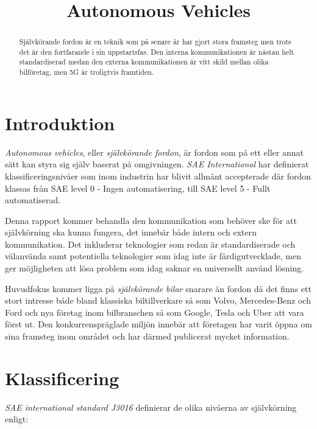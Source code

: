 \documentclass[a4paper]{IEEEtran}
\title{Autonomous Vehicles}
\author{\IEEEauthorblockN{Niklas Hedström, Emil Wihlander\\ }
\IEEEauthorblockA{Lunds Tekniska Högskola\\
Lund, Sverige\\
Email: \{dat15ewi, dat15nhe\}@student.lu.se}}
\begin{document}
\maketitle

\begin{abstract}
Självkörande fordon är en teknik som på senare år har gjort stora framsteg men trots det är den fortfarande i sin uppstartsfas. 
Den interna kommunikationen är nästan helt standardiserad medan den externa kommunikationen är vitt skild mellan olika bilföretag, men 5G är troligtvis framtiden.
\end{abstract}


\section{Introduktion}
\emph{Autonomous vehicles}, eller \emph{självkörande fordon}, är fordon som på ett eller annat sätt kan styra sig själv baserat på omgivningen. 
\emph{SAE International} har definierat klassificeringsnivåer som inom industrin har blivit allmänt accepterade där fordon klassas från SAE level 0 - Ingen automatisering, till SAE level 5 - Fullt automatiserad. \cite{SAE2014} 

Denna rapport kommer behandla den kommunikation som behöver ske för att självkörning ska kunna fungera, det innebär både intern och extern kommunikation. 
Det inkluderar teknologier som redan är standardiserade och välanvända samt potentiella teknologier som idag inte är färdigutvecklade, men ger möjligheten att lösa problem som idag saknar en universellt använd lösning.

Huvudfokus kommer ligga på \emph{självkörande bilar} snarare än fordon då det finns ett stort intresse både bland klassiska biltillverkare så som Volvo, Mercedes-Benz och Ford och nya företag inom bilbranschen så som Google, Tesla och Uber att vara först ut. 
Den konkurrenspräglade miljön innebär att företagen har varit öppna om sina framsteg inom området och har därmed publicerat mycket information. \cite{VolvoAD,MercedesAD,FordAD,GoogleAD,TeslaAD,UberAD}

\section{Klassificering}
\emph{SAE international standard J3016} definierar de olika nivåerna av självkörning enligt: \cite{SAE2014}
\end{document}
